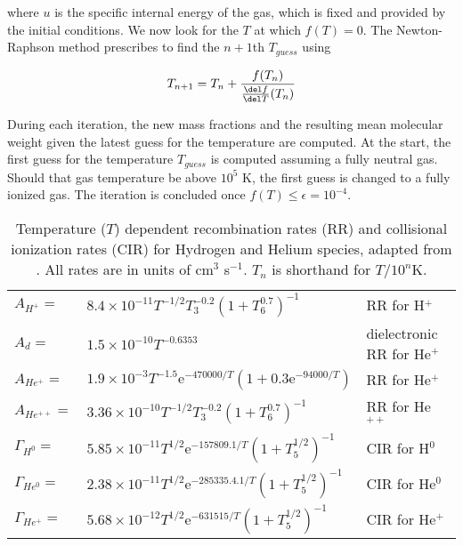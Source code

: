 where $u$ is the specific internal energy of the gas, which is fixed and provided by the initial 
conditions. We now look for the $T$ at which $f(T) = 0$. The Newton-Raphson method prescribes to 
find the $n+1$th $T_{guess}$ using

\begin{align}
    T_{n+1} = T_n + \frac{f(T_n)}{\frac{\del f}{\del T}(T_n)}
\end{align}

During each iteration, the new mass fractions and the resulting mean molecular weight given the 
latest guess for the temperature are computed. At the start, the first guess for the temperature 
$T_{guess}$ is computed assuming a fully neutral gas. Should that gas temperature be above $10^5$ K, 
the first guess is changed to a fully ionized gas. The iteration is concluded once $f(T) \leq 
\epsilon = 10^{-4}$.



\begin{table}
\begin{center}
\begin{tabular}{lll}
\hline
$A_{H^+}         = $ & 
    $8.4 \times 10^{-11} T^{-1/2} T_3^{-0.2} (1 + T_6^{0.7})^{-1}$ & 
    RR for H$^{+}$ \\
$A_{d}           = $ &
    $1.5 \times 10^{-10} T^{-0.6353}$    & 
    dielectronic RR for He$^{+}$ \\
$A_{He^+}        = $ & 
    $1.9 \times 10^{-3} T^{-1.5} \mathrm{e}^{-470000/T} (1 + 0.3 \mathrm{e}^{-94000/T})$    & 
    RR for He$^{+}$ \\
$A_{He^{++}}     = $ & 
    $3.36 \times 10^{-10} T^{-1/2} T_3^{-0.2} (1 + T_6^{0.7})^{-1}$    & 
    RR for He$^{++}$ \\
\hline
$\Gamma_{H^{0}}  = $ & 
    $5.85 \times 10^{-11} T^{1/2} \mathrm{e}^{-157809.1/T} ( 1 + T_5^{1/2})^{-1}$& 
    CIR for H$^{0}$ \\
$\Gamma_{He^{0}} = $ & 
    $2.38 \times 10^{-11} T^{1/2} \mathrm{e}^{-285335.4.1/T} ( 1 + T_5^{1/2})^{-1}$& 
    CIR for He$^{0}$ \\
$\Gamma_{He^{+}} = $ & 
    $5.68 \times 10^{-12} T^{1/2} \mathrm{e}^{-631515/T} ( 1 + T_5^{1/2})^{-1}$& 
    CIR for He$^{+}$ \\
\hline
\end{tabular}
\end{center}
\caption{Temperature ($T$) dependent recombination rates (RR) and collisional ionization rates 
(CIR) for Hydrogen and Helium species, adapted from \citet{katzCosmologicalSimulationsTreeSPH1996}. 
All rates are in units of cm$^3$ s$^{-1}$. $T_n$ is shorthand for $T / 10^n$K.}
\label{tab:coll-ion-rates-katz}
\end{table}










